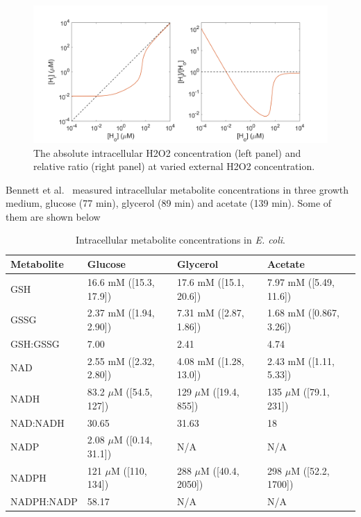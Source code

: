 \documentclass[10pt]{article}
\begin{document}
\begin{figure}[H]
\centering
  \includegraphics[width=0.85\linewidth]{Hin_Hout_relation.png}
  \caption{The absolute intracellular H2O2 concentration (left panel) and relative ratio (right panel) at varied external H2O2 concentration.}
  \label{fig:Hin_Hout_relation}
\end{figure}

Bennett et al.~\cite{bennett2009absolute} measured intracellular metabolite concentrations in three growth medium, glucose (77 min), glycerol (89 min) and acetate (139 min). Some of them are shown below
\begin{table}[H]
  \begin{center}
    \begin{tabular}{|l|l|l|l|} %
    \hline
     \textbf{Metabolite} & \textbf{Glucose} & \textbf{Glycerol} & \textbf{Acetate}\\
      \hline
      GSH & 16.6 mM ([15.3, 17.9]) & 17.6 mM ([15.1, 20.6]) & 7.97 mM ([5.49, 11.6]) \\ \hline
      GSSG & 2.37 mM ([1.94, 2.90]) & 7.31 mM ([2.87, 1.86]) & 1.68 mM ([0.867, 3.26]) \\ \hline
      GSH:GSSG & 7.00 & 2.41 & 4.74 \\ \hline
      NAD & 2.55 mM ([2.32, 2.80]) & 4.08 mM ([1.28, 13.0]) & 2.43 mM ([1.11, 5.33]) \\ \hline
      NADH & 83.2 $\mu$M ([54.5, 127]) & 129 $\mu$M ([19.4, 855]) & 135 $\mu$M ([79.1, 231]) \\ \hline
      NAD:NADH & 30.65 & 31.63 & 18 \\ \hline
      NADP & 2.08 $\mu$M ([0.14, 31.1]) & N/A & N/A \\ \hline
      NADPH & 121 $\mu$M ([110, 134]) & 288 $\mu$M ([40.4, 2050]) & 298 $\mu$M ([52.2, 1700]) \\ \hline
      NADPH:NADP & 58.17 & N/A  & N/A \\ \hline
    \end{tabular}
        \caption{Intracellular metabolite concentrations in \textit{E. coli}.}
    \label{tab:metconc}
  \end{center}
\end{table}
 
\end{document}
